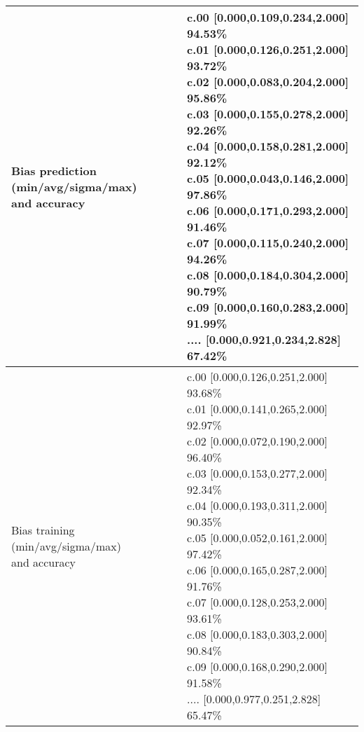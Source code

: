 \begin{center}
\begin{tabular}{|l|l|}
\hline
\makecell{Bias prediction (min/avg/sigma/max)\\and accuracy}&\makecell{c.00 [0.000,0.109,0.234,2.000] 94.53\%\\
c.01 [0.000,0.126,0.251,2.000] 93.72\%\\
c.02 [0.000,0.083,0.204,2.000] 95.86\%\\
c.03 [0.000,0.155,0.278,2.000] 92.26\%\\
c.04 [0.000,0.158,0.281,2.000] 92.12\%\\
c.05 [0.000,0.043,0.146,2.000] 97.86\%\\
c.06 [0.000,0.171,0.293,2.000] 91.46\%\\
c.07 [0.000,0.115,0.240,2.000] 94.26\%\\
c.08 [0.000,0.184,0.304,2.000] 90.79\%\\
c.09 [0.000,0.160,0.283,2.000] 91.99\%\\
.... [0.000,0.921,0.234,2.828] 67.42\%\\
}\\

\hline
\makecell{Bias training (min/avg/sigma/max)\\and accuracy}&\makecell{c.00 [0.000,0.126,0.251,2.000] 93.68\%\\
c.01 [0.000,0.141,0.265,2.000] 92.97\%\\
c.02 [0.000,0.072,0.190,2.000] 96.40\%\\
c.03 [0.000,0.153,0.277,2.000] 92.34\%\\
c.04 [0.000,0.193,0.311,2.000] 90.35\%\\
c.05 [0.000,0.052,0.161,2.000] 97.42\%\\
c.06 [0.000,0.165,0.287,2.000] 91.76\%\\
c.07 [0.000,0.128,0.253,2.000] 93.61\%\\
c.08 [0.000,0.183,0.303,2.000] 90.84\%\\
c.09 [0.000,0.168,0.290,2.000] 91.58\%\\
.... [0.000,0.977,0.251,2.828] 65.47\%\\
}\\
\hline
\end{tabular}\
\end{center}
